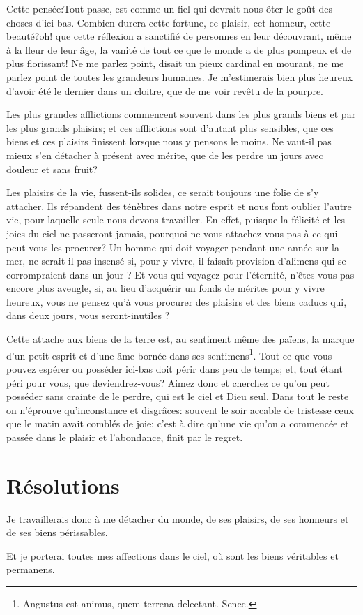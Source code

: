 \documentclass[instructions.tex]{subfiles}
\begin{document}
Cette pensée:\og Tout passe\fg, est comme un fiel qui devrait nous ôter le goût des choses d'ici-bas. \og Combien durera cette fortune, ce plaisir, cet honneur, cette beauté?\fg oh! que cette réflexion a sanctifié de personnes en leur découvrant, même à la fleur de leur âge, la vanité de tout ce que le monde a de plus pompeux et de plus florissant! \og Ne me parlez point\fg, disait un pieux cardinal en mourant, \og ne me parlez point de toutes les grandeurs humaines. Je m'estimerais bien plus heureux d'avoir été le dernier dans un cloitre, que de me voir revêtu de la pourpre\fg. 

Les plus grandes afflictions commencent souvent dans les plus grands biens et par les plus grands plaisirs; et ces afflictions sont d'autant plus sensibles, que ces biens et ces plaisirs finissent lorsque nous y pensons le moins. Ne vaut-il pas mieux s'en détacher à présent avec mérite, que de les perdre un jours avec douleur et sans fruit? 

\secundo Les plaisirs de la vie, fussent-ils solides, ce serait toujours une folie de s'y attacher. Ils répandent des ténèbres dans notre esprit et nous font oublier l'autre vie, pour laquelle seule nous devons travailler. En effet, puisque la félicité et les joies du ciel ne passeront jamais, pourquoi ne vous attachez-vous pas à ce qui peut vous les procurer? Un homme qui doit voyager pendant une année sur la mer, ne serait-il pas insensé si, pour y vivre, il faisait provision d'alimens qui se corrompraient dans un jour ? Et vous qui voyagez pour l'éternité, n'êtes vous pas encore plus aveugle, si, au lieu d'acquérir un fonds de mérites pour y vivre heureux, vous ne pensez qu'à vous procurer des plaisirs et des biens caducs qui, dans deux jours, vous seront-inutiles ? 

Cette attache aux biens de la terre est, au sentiment même des païens, la marque d'un petit esprit et d'une âme bornée dans ses sentimens\footnote{Angustus est animus, quem terrena delectant. Senec.}. Tout ce que vous pouvez espérer ou posséder ici-bas doit périr dans peu de temps; et, tout étant péri pour vous, que deviendrez-vous? Aimez donc et cherchez ce qu'on peut posséder sans crainte de le perdre, qui est le ciel et Dieu seul. Dans tout le reste on n'éprouve qu'inconstance et disgrâces: souvent le soir accable de tristesse ceux que le matin avait comblés de joie; c'est à dire qu'une vie qu'on a commencée et passée dans le plaisir et l'abondance, finit par le regret.

\section{Résolutions}

\primo Je travaillerais donc à me détacher du monde, de ses plaisirs, de ses honneurs et de ses biens périssables.

\secundo Et je porterai toutes mes affections dans le ciel, où sont les biens véritables et permanens.

\end{document}
